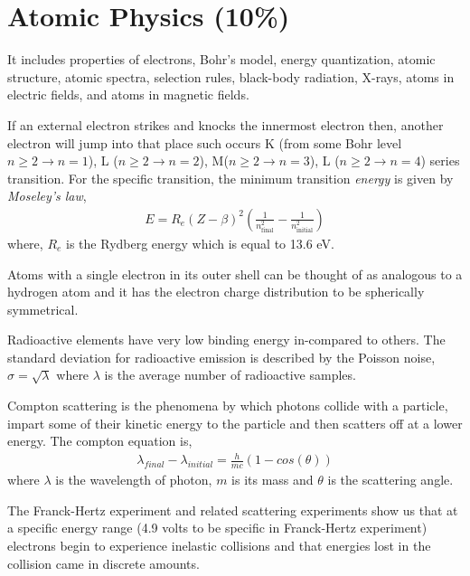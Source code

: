 
\section{Atomic Physics (10\%)}

It includes properties of electrons, Bohr's model, energy quantization, atomic structure, atomic spectra, selection rules, black-body radiation, X-rays, atoms in electric fields, and atoms in magnetic fields.

If an external electron strikes and knocks the innermost electron then, another electron will jump into that place such occurs K (from some Bohr level $n \geq 2 \to n = 1$), L ($n \geq 2 \to n = 2$), M($n \geq 2 \to n = 3$), L ($n \geq 2 \to n = 4$) series transition. For the specific transition, the minimum transition \emph{energy} is given by \emph{Moseley's law},
\begin{align}
E = R_{e} (Z - \beta)^{2} \left( \frac{1}{n_{\text{final}}^{2}} - \frac{1}{n_{\text{initial}}^{2}} \right)
\end{align}
where, $R_{e}$ is the Rydberg energy which is equal to 13.6 eV.

Atoms with a single electron in its outer shell can be thought of as analogous to a hydrogen atom and it has the electron charge distribution to be spherically symmetrical.

Radioactive elements have very low binding energy in-compared to others. The standard deviation for radioactive emission is described by the Poisson noise, $\sigma = \sqrt{\lambda}$ where $\lambda$ is the average number of radioactive samples. 

Compton scattering is the phenomena by which photons collide with a particle, impart some of their kinetic energy to the particle and then scatters off at a lower energy. The compton equation is,
\begin{align}
\lambda_{final} - \lambda_{initial} = \frac{h}{m c}(1 - cos(\theta))
\end{align}
where $\lambda$ is the wavelength of photon, $m$ is its mass and $\theta$ is the scattering angle.

The Franck-Hertz experiment and related scattering experiments show us that at a specific energy range (4.9 volts to be specific in Franck-Hertz experiment) electrons begin to experience inelastic collisions and that energies lost in the collision came in discrete amounts.